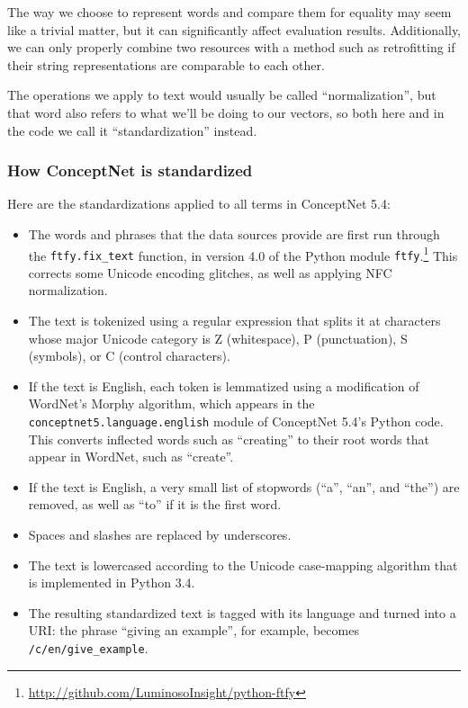 \documentclass[letterpaper]{article}
\begin{document}
The way we choose to represent words and compare them for equality may seem
like a trivial matter, but it can significantly affect evaluation results.
Additionally, we can only properly combine two resources with a method such
as retrofitting if their string representations are comparable to each other.

The operations we apply to text would usually be called ``normalization'',
but that word also refers to what we'll be doing to our vectors, so both
here and in the code we call it ``standardization'' instead.

\subsubsection{How ConceptNet is standardized}

Here are the standardizations applied to all terms in ConceptNet 5.4:

\begin{itemize}
\item The words and phrases that the data sources provide are first run
    through the {\tt ftfy.fix\_text} function, in version 4.0 of the Python
    module {\tt ftfy}.\footnote{
        \url{http://github.com/LuminosoInsight/python-ftfy}
    } This corrects some Unicode encoding glitches, as well as applying
    NFC normalization.
\item The text is tokenized using a regular expression that splits it at
    characters whose major Unicode category is Z (whitespace), P (punctuation),
    S (symbols), or C (control characters).
\item If the text is English, each token is lemmatized using a modification of
    WordNet's Morphy algorithm, which appears in the {\tt conceptnet5.language.english}
    module of ConceptNet 5.4's Python code. This converts inflected words such
    as ``creating'' to their root words that appear in WordNet, such as
    ``create''.
\item If the text is English, a very small list of stopwords (``a'', ``an'',
    and ``the'') are removed, as well as ``to'' if it is the first word.
\item Spaces and slashes are replaced by underscores.
\item The text is lowercased according to the Unicode case-mapping algorithm
    that is implemented in Python 3.4.
\item The resulting standardized text is tagged with its language and turned
    into a URI: the phrase ``giving an example'', for example, becomes
    {\tt /c/en/give\_example}.
\end{itemize}
\end{document}
